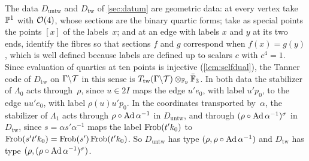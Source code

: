 The data $D_{\mathrm{untw}}$ and $D_{\mathrm{tw}}$ of \cref{sec:datum} are geometric data: at every vertex take $\mathbb{P}^1$
with $\mathcal{O}(4)$, whose sections are the binary quartic forms; take as special points the points $[x]$ of the labels~$x$; and
at an edge with labels $x$ and $y$ at its two ends, identify the fibres so that sections $f$ and $g$ correspond when
$f(x)=g(y)$, which is well defined because labels are defined up to scalars $c$ with $c^4=1$. Since evaluation of quartics
at ten points is injective (\cref{lem:selfdual}), the Tanner code of $D_{\mathrm{tw}}$ on $\Gamma\backslash\mathcal{T}$ in this
sense is $T_{\mathrm{tw}}(\Gamma\backslash\mathcal{T})\otimes_{\mathbb{F}_9}\bar{\mathbb{F}}_3$. In both data the stabilizer of $\Lambda_0$ acts
through~$\rho$, since $u\in2I$ maps the edge $u'e_0$, with label $u'p_0$, to the edge $uu'e_0$, with label $\rho(u)u'p_0$.
In the coordinates transported by~$\alpha$, the stabilizer of $\Lambda_1$ acts through $\rho\circ\operatorname{Ad}\alpha^{-1}$ in
$D_{\mathrm{untw}}$, and through $(\rho\circ\operatorname{Ad}\alpha^{-1})^\sigma$ in $D_{\mathrm{tw}}$, since $s=\alpha s'\alpha^{-1}$ maps the
label $\operatorname{Frob}(t'k_0)$ to $\operatorname{Frob}(s't'k_0)=\operatorname{Frob}(s')\operatorname{Frob}(t'k_0)$. So $D_{\mathrm{untw}}$ has type $(\rho,\rho\circ\operatorname{Ad}\alpha^{-1})$
and $D_{\mathrm{tw}}$ has type $(\rho,(\rho\circ\operatorname{Ad}\alpha^{-1})^\sigma)$.

